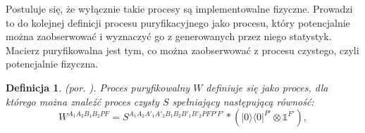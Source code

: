 \documentclass[10pt]{article} %
\newtheorem{definicja}{Definicja}
\DeclareMathOperator{\Trs}{Tr}
\newcommand{\Ket}[1]{|#1\rangle}
\newcommand{\Bra}[1]{\langle#1|}
\newcommand{\BBra}[1]{\langle\langle#1|}
\newcommand{\KKet}[1]{|#1\rangle\rangle}
\newcommand{\I}{\mathbb{1}}
\begin{document}
Postuluje się, że wyłącznie takie procesy są implementowalne fizyczne. Prowadzi to do kolejnej definicji procesu puryfikacyjnego jako procesu, który potencjalnie można zaobserwować i wyznaczyć go z generowanych przez niego statystyk. Macierz puryfikowalna jest tym, co można zaobserwować z procesu czystego, czyli potencjalnie fizyczna.
\begin{definicja}
(por. \cite{purification}). Proces puryfikowalny $W$ definiuje się jako proces, dla którego można znaleźć proces czysty $S$ spełniający następującą równość:
\begin{equation}
\label{eq:purif}
W^{A_1A_2B_1B_2PF} = S^{A_1A_2A'_1A'_2B_1B_2B'_1B'_2PFP'F'} * \left( \Ket{0}\Bra{0}^{P'} \otimes \I^{F'} \right),
\end{equation}
\end{definicja}
\end{document}
